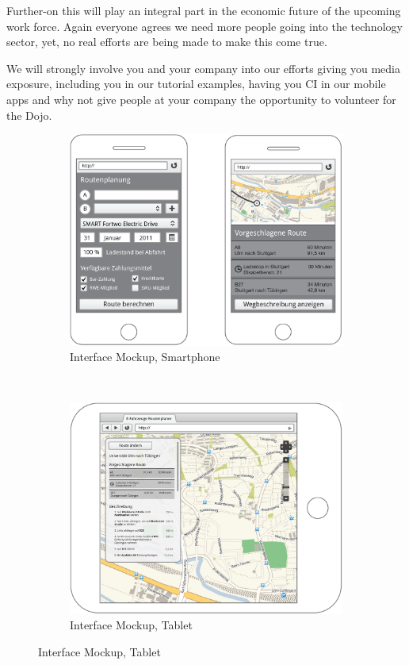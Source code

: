 \documentclass{proposal}
\begin{document}
Further-on this will play an integral part in the economic future of the upcoming work force. Again everyone agrees we need more people going into the technology sector, yet, no real efforts are being made to make this come true.

We will strongly involve you and your company into our efforts giving you media exposure, including you in our tutorial examples, having you CI in our mobile apps and why not give people at your company the opportunity to volunteer for the Dojo.

\begin{figure}[h]
        \centering
        \begin{subfigure}[b]{0.5\textwidth}
                \centering
	  \includegraphics[scale=0.14]{images/phones}
                \caption{Interface Mockup, Smartphone}
                \label{fig:gull}
        \end{subfigure}%
        ~ 
        \begin{subfigure}[b]{0.5\textwidth}
                \centering
                \includegraphics[scale=0.14]{images/tablet}
                \caption{Interface Mockup, Tablet}
                \label{fig:tiger}
        \end{subfigure}
\end{figure}
\end{document}
